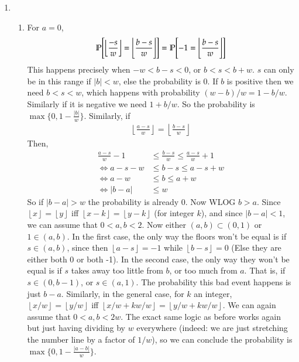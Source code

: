 \documentclass[12pt]{article}
\theoremstyle{definitionstyle}
\newcommand{\floor}[1]{\left\lfloor#1\right\rfloor}
\renewcommand{\P}{\mathbb{P}\qty}
\begin{document}
\begin{enumerate}[leftmargin=\labelsep]
		\item \begin{enumerate}
			\item For $a = 0$, 
		\begin{align*}
			\P[\floor{\frac{-s}{w}} = \floor{\frac{b-s}{w}}] = \P[-1 = \floor{\frac{b-s}{w}}]
		\end{align*}
		This happens precisely when $-w < b-s < 0$, or $b < s < b+w$. $s$ can only be in this range if $|b| < w$, else the probability is 0. If $b$ is positive then we need $b < s < w$, which happens with probability $(w-b)/w = 1 - b/w$. Similarly if it is negative we need $1+b/w$. So the probability is $\max \Big\{0, 1 - \frac{|b|}{w}\Big\}$. Similarly, if 
		\begin{align*}
			\floor{\frac{a-s}{w}} = \floor{\frac{b-s}{w}}
		\end{align*}
		Then,
		\begin{align*}
			\frac{a-s}{w} - 1 &\leq \frac{b-s}{w} \leq \frac{a-s}{w} + 1 \\
			\iff a - s - w &\leq b - s \leq a - s + w \\
			\iff a - w &\leq b \leq a + w \\
			\iff |b-a| &\leq w
		\end{align*}
		So if $|b-a| > w$ the probability is already 0. Now WLOG $b > a$. Since $\floor{x} = \floor{y}$ iff $\floor{x-k} = \floor{y-k}$ (for integer $k$), and since $|b-a| < 1$, we can assume that $0 < a,b < 2$. Now either $(a, b) \subset (0, 1)$ or $1 \in (a, b)$. In the first case, the only way the floors won't be equal is if $s \in (a, b)$, since then $\floor{a-s} = -1$ while $\floor{b-s} = 0$ (Else they are either both 0 or both -1). In the second case, the only way they won't be equal is if $s$ takes away too little from $b$, or too much from $a$. That is, if $s \in (0, b-1)$, or $s \in (a, 1)$. The probability this bad event happens is just $b-a$. Similarly, in the general case, for $k$ an integer, $\floor{x/w} = \floor{y/w}$ iff $\floor{x/w + kw/w} = \floor{y/w + kw/w}$. We can again assume that $0 < a,b < 2w$. The exact same logic as before works again but just having dividing by $w$ everywhere (indeed: we are just stretching the number line by a factor of $1/w$), so we can conclude the probability is $\max \Big\{0, 1 - \frac{|a-b|}{w}\Big\}$.
		

\end{enumerate}
\end{enumerate}
\end{document}

